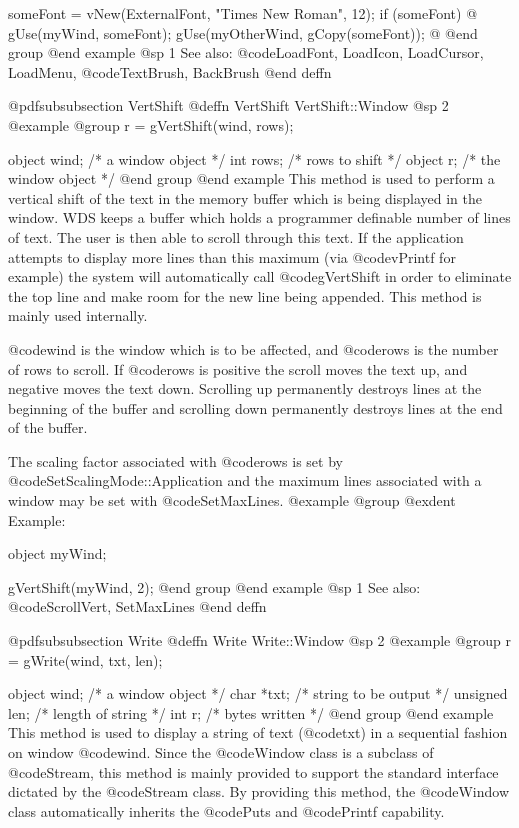 someFont = vNew(ExternalFont, "Times New Roman", 12);
if (someFont)  @{
        gUse(myWind, someFont);
        gUse(myOtherWind, gCopy(someFont));
@}
@end group
@end example
@sp 1
See also:  @code{LoadFont, LoadIcon, LoadCursor, LoadMenu,}
        @code{TextBrush, BackBrush}
@end deffn








@pdfsubsubsection {VertShift}
@deffn {VertShift} VertShift::Window
@sp 2
@example
@group
r = gVertShift(wind, rows);

object  wind;   /*  a window object     */
int     rows;   /*  rows to shift       */
object  r;      /*  the window object   */
@end group
@end example
This method is used to perform a vertical shift of the text in the
memory buffer which is being displayed in the window.  WDS keeps
a buffer which holds a programmer definable number of lines of text.
The user is then able to scroll through this text.  If the application
attempts to display more lines than this maximum (via @code{vPrintf}
for example) the system will automatically call @code{gVertShift} in
order to eliminate the top line and make room for the new line being
appended.  This method is mainly used internally.

@code{wind} is the window which is to be affected, and @code{rows} is the
number of rows to scroll.  If @code{rows} is positive the scroll moves
the text up, and negative moves the text down.  Scrolling up permanently
destroys lines at the beginning of the buffer and scrolling down
permanently destroys lines at the end of the buffer.

The scaling factor associated with @code{rows} is set by
@code{SetScalingMode::Application} and the maximum lines associated with
a window may be set with @code{SetMaxLines}.
@example
@group
@exdent Example:

object  myWind;

gVertShift(myWind, 2);
@end group
@end example
@sp 1
See also:  @code{ScrollVert, SetMaxLines}
@end deffn








@pdfsubsubsection {Write}
@deffn {Write} Write::Window
@sp 2
@example
@group
r = gWrite(wind, txt, len);

object   wind;  /*  a window object       */
char    *txt;   /*  string to be output   */
unsigned len;   /*  length of string      */
int      r;     /*  bytes written         */
@end group
@end example
This method is used to display a string of text (@code{txt}) in a sequential
fashion on window @code{wind}.  Since the @code{Window} class is a subclass
of @code{Stream}, this method is mainly provided to support the standard
interface dictated by the @code{Stream} class.  By providing this method,
the @code{Window} class automatically inherits the @code{Puts} and
@code{Printf} capability.

